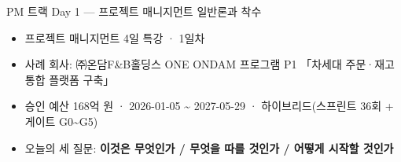 

\begin{frame}[allowframebreaks=1.0]{PM 트랙 Day 1 — 프로젝트 매니지먼트 일반론과 착수}
\small
\begin{itemize}
\item\relax 프로젝트 매니지먼트 4일 특강 · 1일차
\item\relax 사례 회사: ㈜온담F\&B홀딩스 ONE ONDAM 프로그램 P1 「차세대 주문·재고 통합 플랫폼 구축」
\item\relax 승인 예산 168억 원 · 2026-01-05 \textasciitilde{} 2027-05-29 · 하이브리드(스프린트 36회 + 게이트 G0\textasciitilde{}G5)
\item\relax 오늘의 세 질문: \textbf{이것은 무엇인가 / 무엇을 따를 것인가 / 어떻게 시작할 것인가}
\end{itemize}
\end{frame}

